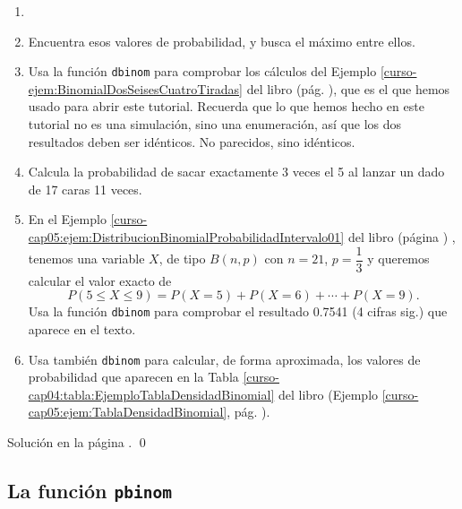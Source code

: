 \documentclass[10pt,a4paper]{article}\usepackage[]{graphicx}\usepackage[]{color}
\begin{document}
\begin{ejercicio}
\label{tut05:ejercicio01}
\begin{enumerate}
  \item[]
  \item Encuentra esos valores de probabilidad, y busca el máximo entre ellos.

  \item Usa la función {\tt dbinom} para comprobar los cálculos del Ejemplo \ref{curso-ejem:BinomialDosSeisesCuatroTiradas} del libro (pág. \pageref{curso-ejem:BinomialDosSeisesCuatroTiradas}), que es el que hemos usado para abrir este tutorial. Recuerda que lo que hemos hecho en este tutorial no es una simulación, sino una enumeración, así que los dos resultados deben ser idénticos. No parecidos, sino idénticos.

  \item Calcula la probabilidad de sacar exactamente 3 veces el 5 al lanzar un dado de 17 caras 11 veces.

  \item En el Ejemplo \ref{curso-cap05:ejem:DistribucionBinomialProbabilidadIntervalo01} del libro (página \pageref{curso-cap05:ejem:DistribucionBinomialProbabilidadIntervalo01}) , tenemos una variable $X$, de tipo $B(n,p)$ con $n=21$, $p=\dfrac{1}{3}$ y queremos calcular el valor exacto de
      \[P(5\leq X\leq 9) = P(X=5) + P(X=6) + \cdots + P(X=9).\]
      Usa la función {\tt dbinom} para comprobar el resultado 0.7541 (4 cifras sig.) que aparece en el texto.

  \item Usa también {\tt dbinom} para calcular, de forma aproximada, los valores de probabilidad que aparecen en la Tabla \ref{curso-cap04:tabla:EjemploTablaDensidadBinomial} del libro (Ejemplo \ref{curso-cap05:ejem:TablaDensidadBinomial}, pág. \pageref{curso-cap04:tabla:EjemploTablaDensidadBinomial}).
\end{enumerate}
Solución en la página \pageref{tut05:ejercicio01:sol}.
\qed
\end{ejercicio}

\subsection{La función {\tt pbinom}}
\label{tut05:subsec:FuncionPbinom}
\end{document}

